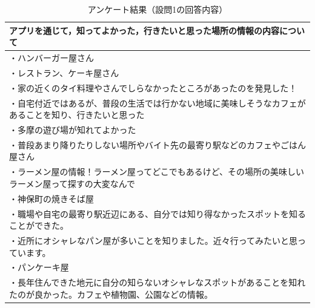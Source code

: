 \documentclass[a4paper]{jsarticle}
\begin{document}
\begin{enumerate}
\begin{enumerate}
\begin{enumerate}
  \begin{table}[H]
    \begin{center}
      \caption{アンケート結果（設問1の回答内容）}
      \renewcommand\arraystretch{1.2}
      \begin{tabular}{|p{15cm}|}
        \hline
        アプリを通じて，知ってよかった，行きたいと思った場所の情報の内容について \\
        \hline
        ・ハンバーガー屋さん \\
        ・レストラン、ケーキ屋さん \\
        ・家の近くのタイ料理やさんでしらなかったところがあったのを発見した！ \\
        ・自宅付近ではあるが、普段の生活では行かない地域に美味しそうなカフェがあることを知り、行きたいと思った \\
        ・多摩の遊び場が知れてよかった \\
        ・普段あまり降りたりしない場所やバイト先の最寄り駅などのカフェやごはん屋さん \\
        ・ラーメン屋の情報！ラーメン屋ってどこでもあるけど、その場所の美味しいラーメン屋って探すの大変なんで \\
        ・神保町の焼きそば屋 \\
        ・職場や自宅の最寄り駅近辺にある、自分では知り得なかったスポットを知ることができた。 \\
        ・近所にオシャレなパン屋が多いことを知りました。近々行ってみたいと思っています。 \\
        ・パンケーキ屋 \\
        ・長年住んできた地元に自分の知らないオシャレなスポットがあることを知れたのが良かった。カフェや植物園、公園などの情報。 \\
        \hline
      \end{tabular}
      \label{tab:curation-01-result}
    \end{center}
  \end{table}


\end{enumerate}
\end{enumerate}
\end{enumerate}
\end{document}
